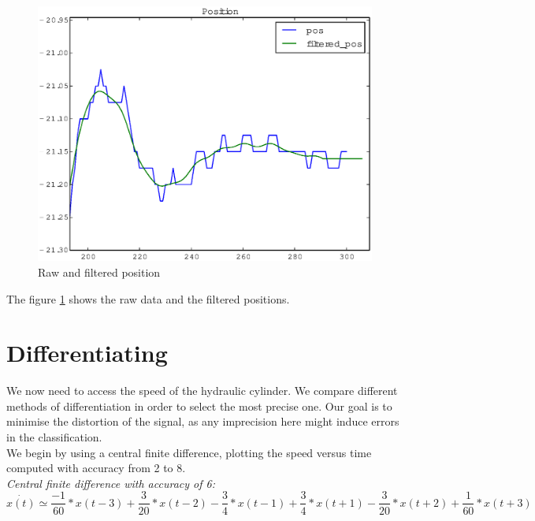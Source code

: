 \documentclass[10pt,a4paper]{report}
\begin{document}
\begin{figure}[h]
	\begin{center}
		\includegraphics[scale=0.5]{Figures/position.eps}
	\end{center}
	\caption{Raw and filtered position}
	\label{fig:positions}
\end{figure}
\noindent The figure \ref{fig:positions} shows the raw data and the filtered positions.


\section{Differentiating}
\label{sec:Differentiating}
We now need to access the speed of the hydraulic cylinder. We compare different methods of differentiation in order to select the most precise one. Our goal is to minimise the distortion of the signal, as any imprecision here might induce errors in the classification.
\\
We begin by using a central finite difference, plotting the speed versus time computed with accuracy from 2 to 8.
\\
\vspace{2in}
\textit{Central finite difference with accuracy of 6:}
\begin{equation}
\label{eq:central_difference}
\dot{x(t)} \simeq \frac{-1}{60} * x(t-3) + \frac{3}{20} * x(t-2) -\frac{3}{4} * x(t-1) + \frac{3}{4} * x(t+1) -\frac{3}{20} * x(t+2) + \frac{1}{60} * x(t+3)
\end{equation}
\end{document}
